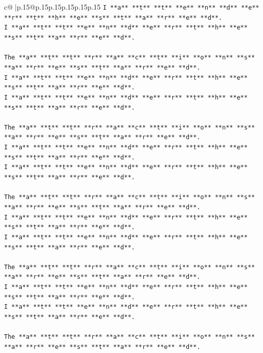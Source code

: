 \documentclass{article}
\begin{document}
{\begin{supertabular}{c@{$\;$}|p{.15\linewidth}@{}p{.15\linewidth}p{.15\linewidth}p{.15\linewidth}p{.15\linewidth}p{.15\linewidth}}
{{{\texttt{I **a** **t** **t** **e** **n** **d** **e** **r** **t** **h** **e** **s** **t** **a** **r** **e** **d**.} \\
\texttt{I **a** **t** **t** **e** **n** **d** **e** **r** **t** **h** **e** **s** **t** **a** **r** **e** **d**.} \\
\\ 
\texttt{The **a** **t** **t** **r** **a** **c** **t** **i** **o** **n** **s** **a** **r** **e** **s** **t** **a** **r** **e** **d**.} \\
\texttt{I **a** **t** **t** **e** **n** **d** **e** **r** **t** **h** **e** **s** **t** **a** **r** **e** **d**.} \\
\texttt{I **a** **t** **t** **e** **n** **d** **e** **r** **t** **h** **e** **s** **t** **a** **r** **e** **d**.} \\
\\ 
\texttt{The **a** **t** **t** **r** **a** **c** **t** **i** **o** **n** **s** **a** **r** **e** **s** **t** **a** **r** **e** **d**.} \\
\texttt{I **a** **t** **t** **e** **n** **d** **e** **r** **t** **h** **e** **s** **t** **a** **r** **e** **d**.} \\
\texttt{I **a** **t** **t** **e** **n** **d** **e** **r** **t** **h** **e** **s** **t** **a** **r** **e** **d**.} \\
\\ 
\texttt{The **a** **t** **t** **r** **a** **c** **t** **i** **o** **n** **s** **a** **r** **e** **s** **t** **a** **r** **e** **d**.} \\
\texttt{I **a** **t** **t** **e** **n** **d** **e** **r** **t** **h** **e** **s** **t** **a** **r** **e** **d**.} \\
\texttt{I **a** **t** **t** **e** **n** **d** **e** **r** **t** **h** **e** **s** **t** **a** **r** **e** **d**.} \\
\\ 
\texttt{The **a** **t** **t** **r** **a** **c** **t** **i** **o** **n** **s** **a** **r** **e** **s** **t** **a** **r** **e** **d**.} \\
\texttt{I **a** **t** **t** **e** **n** **d** **e** **r** **t** **h** **e** **s** **t** **a** **r** **e** **d**.} \\
\texttt{I **a** **t** **t** **e** **n** **d** **e** **r** **t** **h** **e** **s** **t** **a** **r** **e** **d**.} \\
\\ 
\texttt{The **a** **t** **t** **r** **a** **c** **t** **i** **o** **n** **s** **a** **r** **e** **s** **t** **a** **r** **e** **d**.} \\
}}}
\end{supertabular}}
\end{document}

